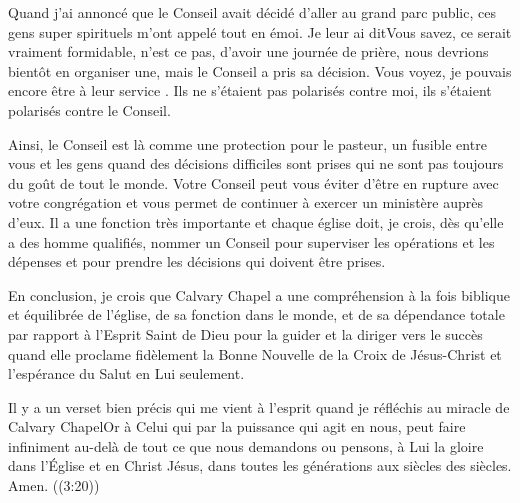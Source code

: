 Quand j'ai annoncé que le Conseil avait décidé d’aller au grand parc public, ces gens super spirituels m’ont appelé
tout en émoi. Je leur ai dit\frcolon\og Vous savez, ce serait vraiment formidable, n’est ce pas, d’avoir une journée de prière,
nous devrions bientôt en organiser une, mais le Conseil a pris sa décision.\fg{} Vous voyez, je pouvais encore être à leur
service . Ils ne s'étaient pas polarisés contre moi, ils s'étaient polarisés contre le Conseil.

Ainsi, le Conseil est là comme une protection pour le pasteur, un fusible entre vous et les gens quand des décisions
difficiles sont prises qui ne sont pas toujours du goût de tout le monde. Votre Conseil peut vous éviter d’être en
rupture avec votre congrégation et vous permet de continuer à exercer un ministère auprès d’eux. Il a une fonction
très importante et chaque église doit, je crois, dès qu’elle a des homme qualifiés, nommer un Conseil pour superviser
les opérations et les dépenses et pour prendre les décisions qui doivent être prises.

En conclusion, je crois que Calvary Chapel a une compréhension à la fois biblique et équilibrée de l'église, de sa
fonction dans le monde, et de sa dépendance totale par rapport à l’Esprit Saint de Dieu pour la guider et la diriger
vers le succès quand elle proclame fidèlement la Bonne Nouvelle de la Croix de Jésus-Christ et l’espérance du Salut en
Lui seulement.

Il y a un verset bien précis qui me vient à l’esprit quand je réfléchis au miracle de Calvary Chapel\frcolon\og Or à Celui qui par
la puissance qui agit en nous, peut faire infiniment au-delà de tout ce que nous demandons ou pensons, à Lui la
gloire dans l’Église et en Christ Jésus, dans toutes les générations aux siècles des siècles. Amen.\fg{} ((3:20))
